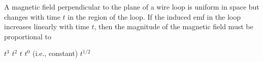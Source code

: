 \begin{questions}\setcounter{question}{25}\question
A magnetic field perpendicular to the plane of a wire loop is uniform in space but changes with time $t$ in the region of the loop. If the induced emf in the loop increases linearly with time $t$, then the magnitude of the magnetic field must be proportional to

\begin{oneparchoices}
\choice $t^{3}$
\choice $t^{2}$
\choice $t$
\choice $t^{0}$ (i.e., constant)
\choice $t^{1 / 2}$
\end{oneparchoices}\end{questions}

